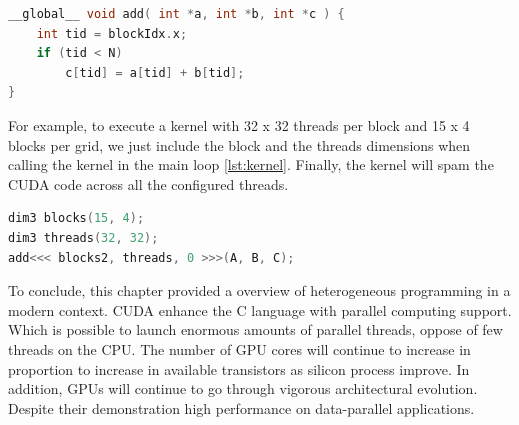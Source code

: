\begin{lstlisting}[language=C++, label={lst:gpu}, caption={GPU Kernel threads launch}]
__global__ void add( int *a, int *b, int *c ) {
	int tid = blockIdx.x;
	if (tid < N)
		c[tid] = a[tid] + b[tid];
}
\end{lstlisting}

For example, to execute a kernel with 32 x 32 threads per block and 15 x 4 blocks per grid, we just include the block and the threads dimensions when calling the kernel in the main loop \ref{lst:kernel}. Finally, the kernel will spam the CUDA code across all the configured threads.

\begin{lstlisting}[language=C++, label={lst:kernel}, caption={kernel call}]
dim3 blocks(15, 4);
dim3 threads(32, 32);
add<<< blocks2, threads, 0 >>>(A, B, C);
\end{lstlisting}


\vspace{3.2em}


To conclude, this chapter provided a overview of heterogeneous programming in a modern context. CUDA enhance the C language with parallel computing support. Which is possible to launch  enormous amounts of parallel threads, oppose of few threads on the CPU. The number of GPU cores will continue to increase in proportion to increase in available transistors as silicon process improve. In addition, GPUs will continue to go through vigorous architectural evolution. Despite their demonstration high performance on data-parallel applications.







